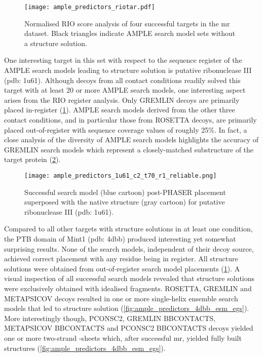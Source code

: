 \begin{figure}[H]
    \centering
    \texttt{[image: ample\_predictors\_riotar.pdf]}
    \caption[RIO score analysis of successful targets]{Normalised RIO score analysis of four successful targets in the \gls{mr} dataset. Black triangles indicate AMPLE search model sets without a structure solution.}
    \label{fig:ample_predictor_riotar}
\end{figure}

One interesting target in this set with respect to the sequence register of the AMPLE search models leading to structure solution is putative ribonuclease III (\gls{pdb}: 1u61). Although decoys from all contact conditions readily solved this target with at least 20 or more AMPLE search models, one interesting aspect arises from the RIO register analysis. Only GREMLIN decoys are primarily placed in-register (\cref{fig:ample_predictor_riotar}). AMPLE search models derived from the other three contact conditions, and in particular those from ROSETTA decoys, are primarily placed out-of-register with sequence coverage values of roughly 25\%. In fact, a close analysis of the diversity of AMPLE search models highlights the accuracy of GREMLIN search models which represent a closely-matched substructure of the target protein (\cref{fig:ample_predictors_1u61_c2_t70_r1_reliable}).  

\begin{figure}[H]
    \centering
    \texttt{[image: ample\_predictors\_1u61\_c2\_t70\_r1\_reliable.png]}
    \caption[Example of successfully placed AMPLE search model]{Successful search model (blue cartoon) post-PHASER placement superposed with the native structure (gray cartoon) for putative ribonuclease III (\gls{pdb}: 1u61).}
    \label{fig:ample_predictors_1u61_c2_t70_r1_reliable}
\end{figure}

Compared to all other targets with structure solutions in at least one condition, the PTB domain of Mint1 (\gls{pdb}: 4dbb) produced interesting yet somewhat surprising results. None of the search models, independent of their decoy source, achieved correct placement with any residue being in register. All structure solutions were obtained from out-of-register search model placements (\cref{fig:ample_predictor_riotar}). A visual inspection of all successful search models revealed that structure solutions were exclusively obtained with idealised fragments. ROSETTA, GREMLIN and METAPSICOV decoys resulted in one or more single-helix ensemble search models that led to structure solution (\cref{fig:ample_predictors_4dbb_esm_egs}). More interestingly though, PCONSC2, GREMLIN BBCONTACTS, METAPSICOV BBCONTACTS and PCONSC2 BBCONTACTS decoys yielded one or more two-strand \textbeta-sheets which, after successful \gls{mr}, yielded fully built structures (\cref{fig:ample_predictors_4dbb_esm_egs}).

